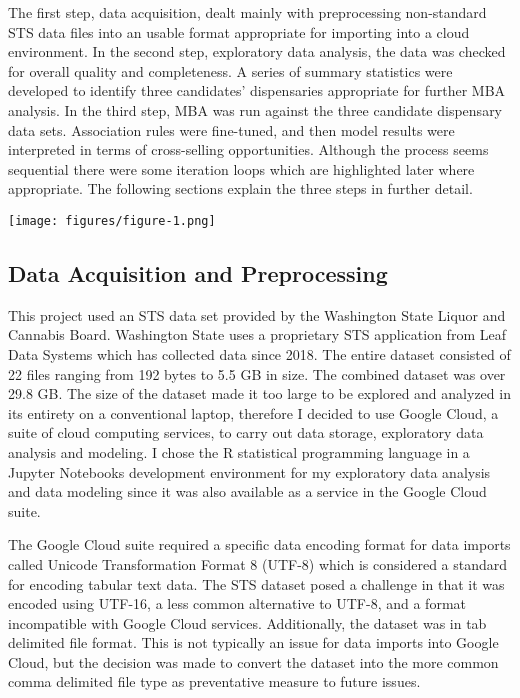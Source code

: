 \documentclass[../article.tex, 12pt]{subfiles}
\begin{document}
\begin{multicols*}{2}
\par
The first step, data acquisition, dealt mainly with preprocessing non-standard STS data files into an usable format appropriate for importing into a cloud environment. In the second step, exploratory data analysis, the data was checked for overall quality and completeness. A series of summary statistics were developed to identify three candidates' dispensaries appropriate for further MBA analysis. In the third step, MBA was run against the three candidate dispensary data sets. Association rules were fine-tuned, and then model results were interpreted in terms of cross-selling opportunities. Although the process seems sequential there were some iteration loops which are highlighted later where appropriate. The following sections explain the three steps in further detail.

\texttt{[image: figures/figure-1.png]}
\label{fig:1}

\subsection{Data Acquisition and Preprocessing}

This project used an STS data set provided by the Washington State Liquor and Cannabis Board. Washington State uses a proprietary STS application from Leaf Data Systems \citep{leafdatasystems} which has collected data since 2018. The entire dataset consisted of 22 files ranging from 192 bytes to 5.5 GB in size. The combined dataset was over 29.8 GB. The size of the dataset made it too large to be explored and analyzed in its entirety on a conventional laptop, therefore I decided to use Google Cloud, a suite of cloud computing services, to carry out data storage, exploratory data analysis and modeling. I chose the R statistical programming language in a Jupyter Notebooks development environment for my exploratory data analysis and data modeling since it was also available as a service in the Google Cloud suite.

\par
The Google Cloud suite required a specific data encoding format for data imports called Unicode Transformation Format 8 (UTF-8) which is considered a standard for encoding tabular text data. The STS dataset posed a challenge in that it was encoded using UTF-16, a less common alternative to UTF-8, and a format incompatible with Google Cloud services. Additionally, the dataset was in tab delimited file format. This is not typically an issue for data imports into Google Cloud, but the decision was made to convert the dataset into the more common comma delimited file type as preventative measure to future issues.


\end{multicols*}
\end{document}
